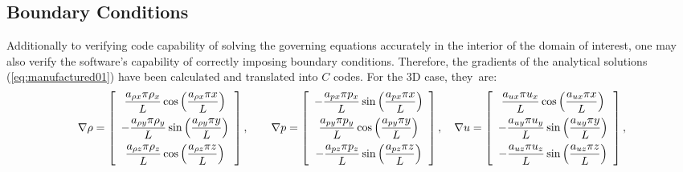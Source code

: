 \documentclass[10pt]{article}
\begin{document}
\subsection{Boundary Conditions}
Additionally to verifying code capability of solving the governing equations accurately in the interior of the domain of interest, one may also verify the software's capability of correctly imposing boundary conditions. Therefore, the gradients of the  analytical solutions (\ref{eq:manufactured01}) have been calculated and translated into $C$ codes. For the 3D case, they~are:
\begin{equation*}
\nabla  \rho= \left[ \begin{array}{c}
 \dfrac{  a_{\rho x}  \pi \rho_x}{L} \cos\left( \dfrac{ a_{\rho x}  \pi  x}{L}\right)\vspace{5pt} \\
-\dfrac{  a_{\rho y}  \pi \rho_y}{L} \sin\left( \dfrac{ a_{\rho y}  \pi  y}{L}\right)\vspace{5pt}\\
 \dfrac{  a_{\rho z}  \pi \rho_z}{L}  \cos\left( \dfrac{ a_{\rho z}  \pi  z}{L}\right)
\end{array} \right],
\qquad
\nabla p = \left[ \begin{array}{c}
- \dfrac{  a_{px}  \pi p_x}{L} \sin\left( \dfrac{ a_{px}  \pi  x}{L}\right)\vspace{5pt}\\
  \dfrac{  a_{py}  \pi p_y}{L} \cos\left( \dfrac{ a_{py}  \pi  y}{L}\right) \vspace{5pt}\\
- \dfrac{  a_{pz}  \pi p_z}{L} \sin\left( \dfrac{ a_{pz}  \pi  z}{L}\right)
\end{array} \right],
\quad
\nabla u = \left[ \begin{array}{c}
  \dfrac{  a_{ux}  \pi u_x}{L} \cos\left( \dfrac{ a_{ux}  \pi  x}{L}\right)\vspace{5pt}\\
 -   \dfrac{  a_{uy}  \pi u_y}{L} \sin\left( \dfrac{ a_{uy}  \pi  y}{L}\right)\vspace{5pt}\\
 -   \dfrac{  a_{uz}  \pi u_z}{L} \sin\left( \dfrac{ a_{uz}  \pi  z}{L}\right)
\end{array} \right],
\end{equation*}
\end{document}

